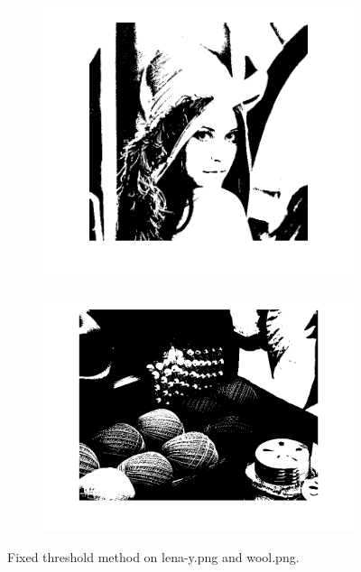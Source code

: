 \documentclass{article}
\begin{document}
  \begin{figure}
        \centering
        \begin{subfigure}[b]{0.49\textwidth}
            \includegraphics[width=\textwidth]{Images/lena_fixed_thresh.png}
        \end{subfigure}
        \begin{subfigure}[b]{0.49\textwidth}
            \includegraphics[width=\textwidth]{Images/wool_fixed_thresh.png}
        \end{subfigure}
        \caption{Fixed threshold method on \textsf{lena-y.png} and \textsf{wool.png}.}
        \label{fig:fixed_thresh}
    \end{figure}
    
\end{document}
